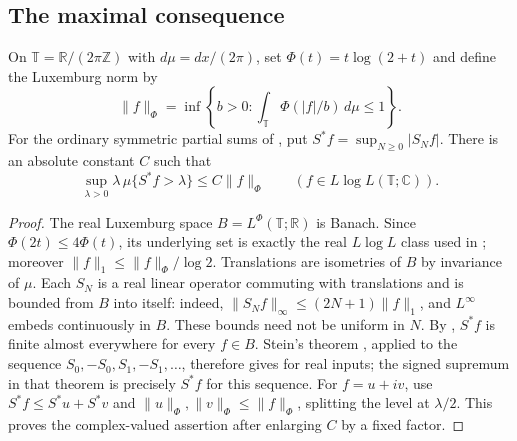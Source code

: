 \subsection{The maximal consequence}

\begin{corollary}\label{cor:fourier-weak-l1}
On $\mathbb T=\mathbb R/(2\pi\mathbb Z)$ with $d\mu=dx/(2\pi)$, set
$\Phi(t)=t\log(2+t)$ and define the Luxemburg norm by
\[
 \|f\|_\Phi
 =\inf\left\{b>0:\int_{\mathbb T}\Phi(|f|/b)\,d\mu\le1\right\}.
\]
For the ordinary symmetric partial sums of , put
$S^*f=\sup_{N\ge0}|S_Nf|$. There is an absolute constant $C$ such that
\begin{equation}\label{eq:fourier-weak-l1}
 \sup_{\lambda>0}\lambda\,\mu\{S^*f>\lambda\}
 \le C\|f\|_\Phi
 \qquad(f\in L\log L(\mathbb T;\mathbb C)).
\end{equation}
\end{corollary}

\begin{proof}
The real Luxemburg space $B=L^\Phi(\mathbb T;\mathbb R)$ is Banach.
Since $\Phi(2t)\le4\Phi(t)$, its underlying set is exactly the real
$L\log L$ class used in ; moreover
$\|f\|_1\le\|f\|_\Phi/\log2$.
Translations are isometries of $B$ by invariance of $\mu$.
Each $S_N$ is a real linear operator commuting with translations and
is bounded from $B$ into itself: indeed,
$\|S_Nf\|_\infty\le(2N+1)\|f\|_1$, and $L^\infty$ embeds continuously
in $B$. These bounds need not be uniform in $N$.
By , $S^*f$ is finite almost everywhere for every $f\in B$.
Stein's theorem \cite[Appendix, Theorem~10]{Stein1961}, applied to the
sequence $S_0,-S_0,S_1,-S_1,\ldots$, therefore gives
 for real inputs; the signed supremum in that
theorem is precisely $S^*f$ for this sequence.
For $f=u+iv$, use $S^*f\le S^*u+S^*v$ and
$\|u\|_\Phi,\|v\|_\Phi\le\|f\|_\Phi$, splitting the level at
$\lambda/2$. This proves the complex-valued assertion after enlarging
$C$ by a fixed factor.
\end{proof}
